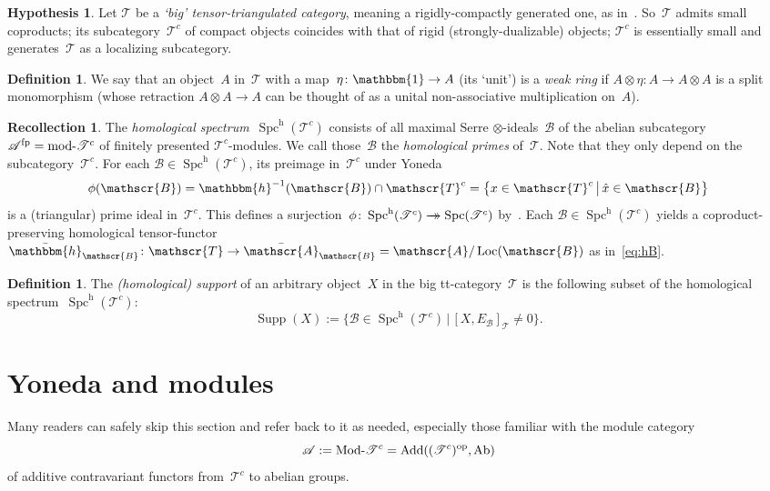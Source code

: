 \documentclass[10pt,a4paper]{amsart}
\newcommand{\onto}{\mathchoice{\to\hspace*{-5mm}\to}{\to\hspace*{-2.85mm}\to}{\to\hspace*{-3mm}\to}{\to\hspace*{-3mm}\to}}
\numberwithin{equation}{section}
\theoremstyle{definition}
\newtheorem{Def}[equation]{Definition}
\newtheorem{Hyp}[equation]{Hypothesis}
\newtheorem{Rec}[equation]{Recollection}
\DeclareMathOperator{\opname}{op}
\DeclareMathOperator{\Spc}{Spc}
\newcommand{\cat}[1]{\mathscr{#1}}
\newcommand{\inv}{^{-1}}
\newcommand{\op}{^{\opname}}
\newcommand{\SET}[2]{\big\{#1\,\big|\,#2\big\}}
\newcommand{\unit}{\mathbbm{1}}
\DeclareMathOperator{\Ab}{Ab}
\DeclareMathOperator{\Add}{Add}
\DeclareMathOperator{\Loc}{Loc}
\DeclareMathOperator{\modname}{mod}
\DeclareMathOperator{\Mod}{Mod}
\newcommand{\smallh}{\mathrm{h}}
\DeclareMathOperator{\Supp}{Supp}
\newcommand{\AB}{\bar{\cA}_{\cB}}
\newcommand{\boneda}{\bar\yoneda}
\newcommand{\cA}{\cat{A}}
\newcommand{\cB}{\cat{B}}
\newcommand{\cT}{\cat{T}}
\newcommand{\EB}{E_{\cB}}
\newcommand{\fp}{^{\textup{fp}}}
\newcommand{\hB}{\boneda_{\cB}}
\newcommand{\modd}{\modname\text{\!-}}
\newcommand{\Modd}{\Mod\text{\!-}}
\newcommand{\MT}{\Modd\cat T^c}
\newcommand{\mT}{\modd\cat T^c}
\newcommand{\SpchT}{\Spch(\cat{T}^c)}
\newcommand{\Spch}{\Spc^{\smallh}}
\newcommand{\SpcT}{\Spc(\cat{T}^c)}
\newcommand{\tensids}{$\otimes$\nobreakdash-ideals}
\newcommand{\yoneda}{\mathbbm{h}}
\begin{document}
\begin{Hyp}
\label{Hyp:big-tt}
Let $\cT$ be a \emph{`big' tensor-triangulated category}, meaning a rigidly-compactly generated one, as in~\cite{BalmerFavi11}. So~$\cT$ admits small coproducts; its subcategory~$\cT^c$ of compact objects coincides with that of rigid (strongly-dualizable) objects; $\cT^c$ is essentially small and generates~$\cT$ as a localizing subcategory.
\end{Hyp}

\begin{Def}
\label{Def:weak-ring}
We say that an object~$A$ in~$\cT$ with a map~$\eta\colon \unit\to A$ (its `unit') is a \emph{weak ring} if $A\otimes\eta\colon A\to A\otimes A$ is a split monomorphism (whose retraction $A\otimes A\to A$ can be thought of as a unital non-associative multiplication on~$A$).
\end{Def}

\begin{Rec}
\label{Rec:Spch}
The \emph{homological spectrum}~$\SpchT$ consists of all maximal Serre \tensids\ $\cB$ of the abelian subcategory~$\cA\fp=\mT$ of finitely presented $\cT^c$\nobreakdash-modules. We call those~$\cB$ the \emph{homological primes} of~$\cT$. Note that they only depend on the subcategory~$\cT^c$. For each $\cB\in\SpchT$, its preimage in~$\cT^c$ under Yoneda
\[
\phi(\cB)=\yoneda\inv(\cB)\cap \cT^c=\SET{x\in\cT^c}{\hat x\in\cB}
\]
is a (triangular) prime ideal in~$\cT^c$. This defines a surjection~$\phi\colon\SpchT\onto \SpcT$ by~\cite[Cor.\,3.9]{Balmer20a}. Each $\cB\in\SpchT$ yields a coproduct-preserving homological tensor-functor $\hB\colon \cT\to \AB=\cA/\Loc(\cB)$ as in~\eqref{eq:hB}.
\end{Rec}

\begin{Def}
\label{Def:Supp}
The \emph{(homological) support} of an arbitrary object~$X$ in the big tt-category~$\cat{T}$ is the following subset of the homological spectrum~$\SpchT$:
\[
\Supp(X):=\SET{\cB\in\SpchT}{[X,\EB]_{\cT}\neq 0}.
\]
\end{Def}

\section{Yoneda and modules}
\label{sec:modules}

Many readers can safely skip this section and refer back to it as needed, especially those familiar with the module category
\[
\cA:=\MT=\Add((\cT^c)\op,\Ab)
\]
of additive contravariant functors from~$\cT^c$ to abelian groups.
\end{document}
